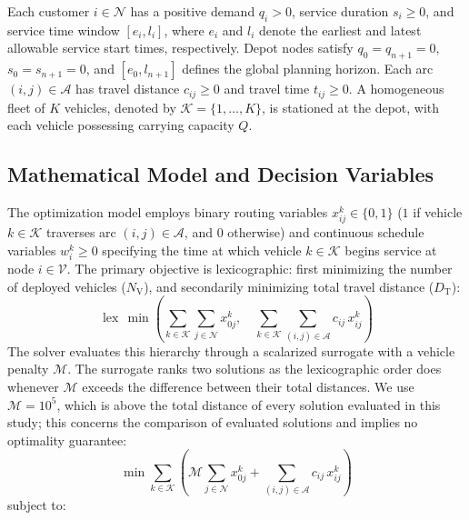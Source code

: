 \documentclass{ieeeaccess}
\newcommand{\NV}{{N_\mathrm{V}}}
\newcommand{\TD}{{D_\mathrm{T}}}
\begin{document}
Each customer $i \in \mathcal{N}$ has a positive demand $q_i > 0$, service duration $s_i \ge 0$, and service time window $[e_i, l_i]$, where $e_i$ and $l_i$ denote the earliest and latest allowable service start times, respectively. Depot nodes satisfy $q_0 = q_{n+1} = 0$, $s_0 = s_{n+1} = 0$, and $[e_0, l_{n+1}]$ defines the global planning horizon. Each arc $(i, j) \in \mathcal{A}$ has travel distance $c_{ij} \ge 0$ and travel time $t_{ij} \ge 0$. A homogeneous fleet of $K$ vehicles, denoted by $\mathcal{K} = \{1, \dots, K\}$, is stationed at the depot, with each vehicle possessing carrying capacity $Q$.

\subsection{Mathematical Model and Decision Variables}
The optimization model employs binary routing variables $x_{ij}^k \in \{0, 1\}$ ($1$ if vehicle $k \in \mathcal{K}$ traverses arc $(i, j) \in \mathcal{A}$, and $0$ otherwise) and continuous schedule variables $w_i^k \ge 0$ specifying the time at which vehicle $k \in \mathcal{K}$ begins service at node $i \in \mathcal{V}$. The primary objective is lexicographic: first minimizing the number of deployed vehicles ($\NV$), and secondarily minimizing total travel distance ($\TD$):
\begin{equation}
  \operatorname{lex}\,\min \left( \sum_{k \in \mathcal{K}} \sum_{j \in \mathcal{N}} x_{0j}^k, \quad \sum_{k \in \mathcal{K}} \sum_{(i,j) \in \mathcal{A}} c_{ij}\,x_{ij}^k \right)
  \label{eq:lexicographic_obj}
\end{equation}
The solver evaluates this hierarchy through a scalarized surrogate with a vehicle penalty $\mathcal{M}$. The surrogate ranks two solutions as the lexicographic order does whenever $\mathcal{M}$ exceeds the difference between their total distances. We use $\mathcal{M} = 10^5$, which is above the total distance of every solution evaluated in this study; this concerns the comparison of evaluated solutions and implies no optimality guarantee:
\begin{equation}
  \min \sum_{k \in \mathcal{K}} \left( \mathcal{M} \sum_{j \in \mathcal{N}} x_{0j}^k + \sum_{(i,j) \in \mathcal{A}} c_{ij}\,x_{ij}^k \right)
  \label{eq:scalarized_obj}
\end{equation}
subject to:
\end{document}
